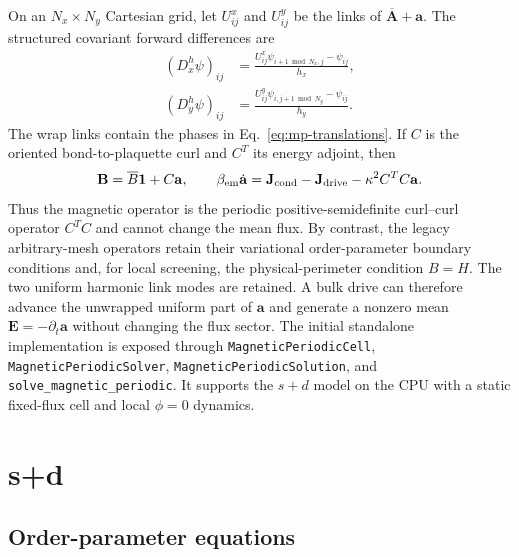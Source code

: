 \documentclass[11pt]{article}
\begin{document}
On an $N_x\times N_y$ Cartesian grid, let $U^x_{ij}$ and $U^y_{ij}$ be the
links of $\overline{\mathbf A}+\mathbf a$.  The structured covariant forward
differences are
\begin{align}
    (D_x^h\psi)_{ij}
      &=\frac{U^x_{ij}\psi_{i+1\bmod N_x,j}-\psi_{ij}}{h_x},\\
    (D_y^h\psi)_{ij}
      &=\frac{U^y_{ij}\psi_{i,j+1\bmod N_y}-\psi_{ij}}{h_y}.
    \label{eq:mp-covariant-differences}
\end{align}
The wrap links contain the phases in Eq.~\eqref{eq:mp-translations}.  If $C$
is the oriented bond-to-plaquette curl and $C^T$ its energy adjoint, then
\begin{equation}
    \mathbf B=\overline B\mathbf 1+C\mathbf a,\qquad
    \beta_{\rm em}\dot{\mathbf a}
       =\mathbf J_{\rm cond}-\mathbf J_{\rm drive}
        -\kappa^2C^TC\mathbf a.
    \label{eq:mp-maxwell}
\end{equation}
Thus the magnetic operator is the periodic positive-semidefinite curl--curl
operator $C^TC$ and cannot change the mean flux.  By contrast, the legacy
arbitrary-mesh operators retain their variational order-parameter boundary
conditions and, for local screening, the physical-perimeter condition $B=H$.
The two uniform harmonic link modes are retained.  A bulk drive can therefore
advance the unwrapped uniform part of $\mathbf a$ and generate a nonzero mean
$\mathbf E=-\partial_t\mathbf a$ without changing the flux sector.
The initial standalone implementation is exposed through
\texttt{MagneticPeriodicCell}, \texttt{MagneticPeriodicSolver},
\texttt{MagneticPeriodicSolution}, and \texttt{solve\_magnetic\_periodic}.  It
supports the $s+d$ model on the CPU with a static fixed-flux cell and local
$\phi=0$ dynamics.

\section{s+d \cite{Goncalves2014,Zhu1999,Li1999}}

\subsection{Order-parameter equations}
\end{document}

